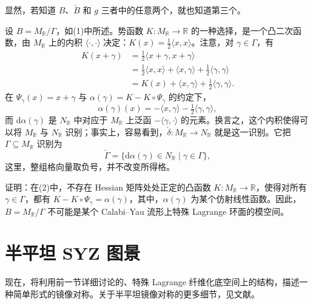 显然，若知道 $B$、$\check B$ 和 $g$ 三者中的任意两个，就也知道第三个。

\begin{example}\label{ex:6.10}
设 $B=M_{\mathbb R}/\Gamma$，如(1)中所述。势函数 $K\colon M_{\mathbb R}\to\mathbb R$ 的一种选择，是一个凸二次函数，由 $M_{\mathbb R}$ 上的内积 $\langle\cdot,\cdot\rangle$ 决定：$K(x)=\tfrac12\langle x,x\rangle$。注意，对 $\gamma\in\Gamma$，有
\[
\begin{aligned}
K(x+\gamma)
&=\tfrac12\langle x+\gamma,x+\gamma\rangle\\
&=\tfrac12\langle x,x\rangle+\langle x,\gamma\rangle
  +\tfrac12\langle\gamma,\gamma\rangle\\
&=K(x)+\langle x,\gamma\rangle+\tfrac12\langle\gamma,\gamma\rangle.
\end{aligned}
\]
在 $\Psi_\gamma(x)=x+\gamma$ 与 $\alpha(\gamma)=K-K\circ\Psi_\gamma$ 的约定下，
\[
\alpha(\gamma)(x)=-\langle x,\gamma\rangle-\tfrac12\langle\gamma,\gamma\rangle,
\]
而 $\mathrm d\alpha(\gamma)$ 是 $N_{\mathbb R}$ 中对应于 $M_{\mathbb R}$ 上泛函 $-\langle\gamma,\cdot\rangle$ 的元素。换言之，这个内积使得可以将 $M_{\mathbb R}$ 与 $N_{\mathbb R}$ 识别；事实上，容易看到，$\check\delta\colon M_{\mathbb R}\to N_{\mathbb R}$ 就是这一识别。它把 $\Gamma\subseteq M_{\mathbb R}$ 识别为
\[
\check\Gamma=\{\mathrm d\alpha(\gamma)\in N_{\mathbb R}\mid\gamma\in\Gamma\},
\]
这里，整组格向量取负号，并不改变所得格。
\end{example}

\begin{exercise}\label{exer:6.11}
证明：在(2)中，不存在 Hessian 矩阵处处正定的凸函数 $K\colon M_{\mathbb R}\to\mathbb R$，使得对所有 $\gamma\in\Gamma$，都有 $K-K\circ\Psi_\gamma=\alpha(\gamma)$，其中，$\alpha(\gamma)$ 为某个仿射线性函数。因此，$B=M_{\mathbb R}/\Gamma$ 不可能是某个 Calabi--Yau 流形上特殊 Lagrange 环面的模空间。
\end{exercise}

\section{半平坦 SYZ 图景}\label{sec:6.2}

现在，将利用前一节详细讨论的、特殊 Lagrange 纤维化底空间上的结构，描述一种简单形式的镜像对称。关于半平坦镜像对称的更多细节，见文献。

